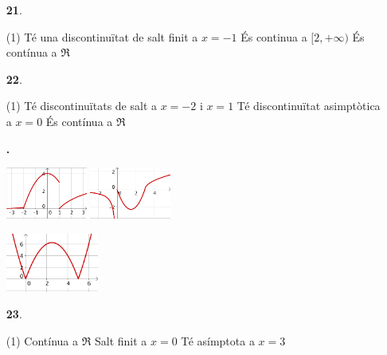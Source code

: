 \documentclass[a4paper, pdf, twoside]{book}
\begin{document}
\begin{multicols}{2}
\begin{enumerate}

 \item[\fontfamily{phv}\selectfont\color{blue}\textbf{21}. ] 
 \begin{tasks}[column-sep=1em, item-indent=1.3333em](1)
	 \task* Té una discontinuïtat de salt finit a $x=-1$
	 \task És continua a $[2,+\infty )$
	 \task És contínua a $\Re $
\end{tasks}
\vspace{0.25cm}



 \item[\fontfamily{phv}\selectfont\color{blue}\textbf{22}. ] 
 \begin{tasks}[column-sep=1em, item-indent=1.3333em](1)
	 \task* Té discontinuïtats de salt a $x=-2$ i $x=1$
	 \task* Té discontinuïtat asimptòtica a $x=0$
	 \task És contínua a $\Re $ 
\end{tasks}
\vspace{0.25cm}
\item[\fontfamily{phv}\selectfont\color{blue}\textbf{. }] 
\mbox {} \par \includegraphics [width=0.21\textwidth ]{img-sol/t6-22a} \includegraphics [width=0.21\textwidth ]{img-sol/t6-22b} \par \includegraphics [width=0.24\textwidth ]{img-sol/t6-22c} 
\vspace{0.25cm}



 \item[\fontfamily{phv}\selectfont\color{blue}\textbf{23}. ] 
 \begin{tasks}[column-sep=1em, item-indent=1.3333em](1)
	 \task Contínua a $\Re $
	 \task Salt finit a $x=0$
	 \task Té asímptota a $x=3$
\end{tasks}
\vspace{0.25cm}



\end{enumerate}
\end{multicols}
\end{document}
